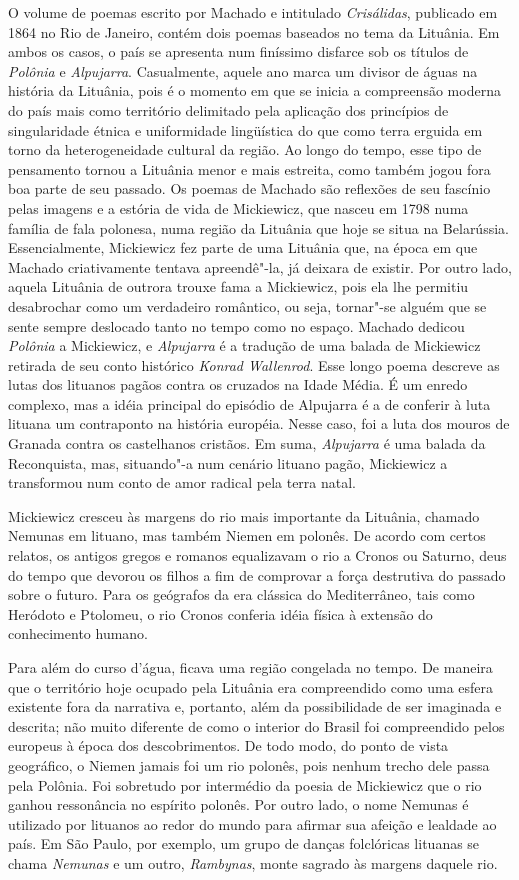 O volume de poemas escrito por Machado e intitulado \emph{Crisálidas},
publicado em 1864 no Rio de Janeiro, contém dois poemas baseados no tema
da Lituânia. Em ambos os casos, o país se apresenta num finíssimo
disfarce sob os títulos de \emph{Polônia} e \emph{Alpujarra}.
Casualmente, aquele ano marca um divisor de águas na história da
Lituânia, pois é o momento em que se inicia a compreensão moderna do
país mais como território delimitado pela aplicação dos princípios de
singularidade étnica e uniformidade lingüística do que como terra
erguida em torno da heterogeneidade cultural da região. Ao longo do
tempo, esse tipo de pensamento tornou a Lituânia menor e mais estreita,
como também jogou fora boa parte de seu passado. Os poemas de Machado
são reflexões de seu fascínio pelas imagens e a estória de vida de
Mickiewicz, que nasceu em 1798 numa família de fala polonesa, numa
região da Lituânia que hoje se situa na Belarússia. Essencialmente,
Mickiewicz fez parte de uma Lituânia que, na época em que Machado
criativamente tentava apreendê"-la, já deixara de existir. Por outro
lado, aquela Lituânia de outrora trouxe fama a Mickiewicz, pois ela lhe
permitiu desabrochar como um verdadeiro romântico, ou seja, tornar"-se
alguém que se sente sempre deslocado tanto no tempo como no espaço.
Machado dedicou \emph{Polônia} a Mickiewicz, e \emph{Alpujarra} é a
tradução de uma balada de Mickiewicz retirada de seu conto histórico
\emph{Konrad Wallenrod}. Esse longo poema descreve as lutas dos lituanos
pagãos contra os cruzados na Idade Média. É um enredo complexo, mas a
idéia principal do episódio de Alpujarra é a de conferir à luta lituana
um contraponto na história européia. Nesse caso, foi a luta dos mouros
de Granada contra os castelhanos cristãos. Em suma, \emph{Alpujarra} é
uma balada da Reconquista, mas, situando"-a num cenário lituano pagão,
Mickiewicz a transformou num conto de amor radical pela terra natal.

Mickiewicz cresceu às margens do rio mais importante da Lituânia,
chamado Nemunas em lituano, mas também Niemen em polonês. De acordo com
certos relatos, os antigos gregos e romanos equalizavam o rio a Cronos
ou Saturno, deus do tempo que devorou os filhos a fim de comprovar a
força destrutiva do passado sobre o futuro. Para os geógrafos da era
clássica do Mediterrâneo, tais como Heródoto e Ptolomeu, o rio Cronos
conferia idéia física à extensão do conhecimento humano.

Para além do curso d'água, ficava uma região congelada no tempo. De
maneira que o território hoje ocupado pela Lituânia era compreendido
como uma esfera existente fora da narrativa e, portanto, além da
possibilidade de ser imaginada e descrita; não muito diferente de como o
interior do Brasil foi compreendido pelos europeus à época dos
descobrimentos. De todo modo, do ponto de vista geográfico, o Niemen
jamais foi um rio polonês, pois nenhum trecho dele passa pela Polônia.
Foi sobretudo por intermédio da poesia de Mickiewicz que o rio ganhou
ressonância no espírito polonês. Por outro lado, o nome Nemunas é
utilizado por lituanos ao redor do mundo para afirmar sua afeição e
lealdade ao país. Em São Paulo, por exemplo, um grupo de danças
folclóricas lituanas se chama \emph{Nemunas} e um outro,
\emph{Rambynas}, monte sagrado às margens daquele rio.


